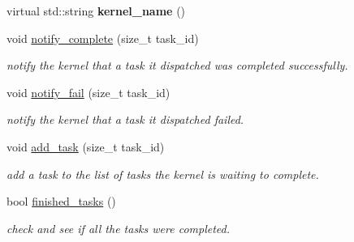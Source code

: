 \begin{DoxyCompactItemize}
\mbox{\label{classral_1_1cache_1_1kernel_aafcb0f431c87f166a778a6cce0d36d51}} 
virtual std\+::string {\bfseries kernel\+\_\+name} ()
\item 
\mbox{\label{classral_1_1cache_1_1kernel_a0d4a11f11203e46edff09aafc3935688}} 
void \hyperlink{classral_1_1cache_1_1kernel_a0d4a11f11203e46edff09aafc3935688}{notify\+\_\+complete} (size\+\_\+t task\+\_\+id)
\begin{DoxyCompactList}\small\item\em notify the kernel that a task it dispatched was completed successfully. \end{DoxyCompactList}\item 
\mbox{\label{classral_1_1cache_1_1kernel_aacb25cb9e49377bca219769f0eb82aef}} 
void \hyperlink{classral_1_1cache_1_1kernel_aacb25cb9e49377bca219769f0eb82aef}{notify\+\_\+fail} (size\+\_\+t task\+\_\+id)
\begin{DoxyCompactList}\small\item\em notify the kernel that a task it dispatched failed. \end{DoxyCompactList}\item 
\mbox{\label{classral_1_1cache_1_1kernel_a9b0a80f937f10357ae62638b6f0461d4}} 
void \hyperlink{classral_1_1cache_1_1kernel_a9b0a80f937f10357ae62638b6f0461d4}{add\+\_\+task} (size\+\_\+t task\+\_\+id)
\begin{DoxyCompactList}\small\item\em add a task to the list of tasks the kernel is waiting to complete. \end{DoxyCompactList}\item 
\mbox{\label{classral_1_1cache_1_1kernel_a3c5beb224576167cd7f9488e68d8ff62}} 
bool \hyperlink{classral_1_1cache_1_1kernel_a3c5beb224576167cd7f9488e68d8ff62}{finished\+\_\+tasks} ()
\begin{DoxyCompactList}\small\item\em check and see if all the tasks were completed. \end{DoxyCompactList}\end{DoxyCompactItemize}
